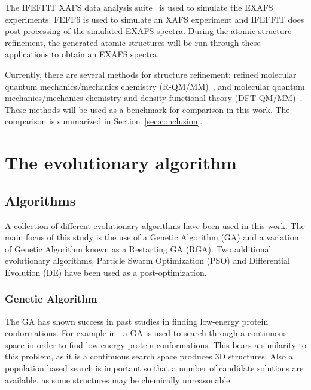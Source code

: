 \documentclass[conference]{IEEEtran}
\begin{document}
The IFEFFIT XAFS data analysis suite~\cite{ifeffit} is used to simulate the EXAFS experiments. FEFF6 is used to simulate an XAFS experiment and IFEFFIT does post processing of the simulated EXAFS spectra. During the atomic structure refinement, the generated atomic structures will be run through these applications to obtain an EXAFS spectra.

Currently, there are several methods for structure refinement: refined molecular quantum mechanics/mechanics chemistry (R-QM/MM)~\cite{luber2011s1}, and molecular quantum mechanics/mechanics chemistry and density functional theory (DFT-QM/MM)~\cite{luber2011s1}. These methods will be used as a benchmark for comparison in this work. The comparison is summarized in Section~\ref{sec:conclusion}.


\section{The evolutionary algorithm}
\label{sec:evolutionaryAlgorithm}

\subsection{Algorithms}

A collection of different evolutionary algorithms have been used in this work. The main focus of this study is the use of a Genetic Algorithm (GA) and a variation of Genetic Algorithm known as a Restarting GA (RGA). Two additional evolutionary algorithms, Particle Swarm Optimization (PSO) and Differential Evolution (DE) have been used as a post-optimization.

\subsubsection{Genetic Algorithm}

The GA has shown success in past studies in finding low-energy protein conformations. For example in~\cite{comte2010bioinspired} a GA is used to search through a continuous space in order to find low-energy protein conformations. This bears a similarity to this problem, as it is a continuous search space produces 3D structures. Also a population based search is important so that a number of candidate solutions are available, as some structures may be chemically unreasonable.
\end{document}

